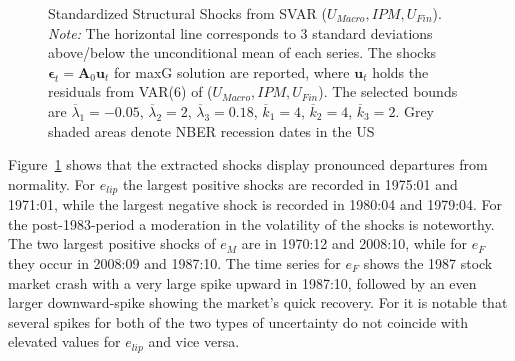 \documentclass[a4paper,11pt,listof=nochaptergap,oneside,pointednumbers,bibtotoc,bigheadings,liststotoc,hidelinks]{scrbook}
\theoremstyle{mysatz}
\theoremstyle{mydefinition}
\theoremstyle{mytheorem}
\theoremstyle{mybemerkung}
\newcommand{\vect}[1]{\boldsymbol{\mathbf{#1}}}
\begin{document}
\begin{figure}[!h]
   \centering
   \setlength\fboxsep{0pt}
   \setlength\fboxrule{0pt}
      \caption[Standardized Structural Shocks from SVAR ($U_{Macro}, IPM, U_{Fin}$).]{Standardized Structural Shocks from SVAR ($U_{Macro}, IPM, U_{Fin}$).\\
      \textit{Note:}  The horizontal line corresponds to 3 standard deviations above/below the unconditional mean of each series. The shocks $\vect{\epsilon}_t = \vect{A}_0\vect{u}_t$ for maxG solution are reported, where $\vect{u}_t$ holds the residuals from VAR(6) of ($U_{Macro}, IPM, U_{Fin}$). The selected bounds are $\overline{\lambda}_1 = -0.05$, $\overline{\lambda}_2 = 2$, $\overline{\lambda}_3 = 0.18$, $\overline{k}_1 = 4$, $\overline{k}_2 = 4$, $\overline{k}_3 = 2$. Grey shaded areas denote NBER recession dates in the US}   \label{fig:ludvigsonetal_timeseries_e_shocks}
\end{figure}

Figure~\ref{fig:ludvigsonetal_timeseries_e_shocks} shows that the extracted shocks display pronounced departures from normality. For $e_{lip}$ the largest positive shocks are recorded in 1975:01 and 1971:01, while the largest negative shock is recorded in 1980:04 and 1979:04. For the post-1983-period a moderation in the volatility of the shocks is noteworthy. The two largest positive shocks of $e_{M}$ are in 1970:12 and 2008:10, while for $e_{F}$ they occur in 2008:09 and 1987:10. The time series for $e_{F}$ shows the 1987 stock market crash with a very large spike upward in 1987:10, followed by an even larger downward-spike showing the market's quick recovery. For \citet{ludvigsonetal:18} it is notable that several spikes for both of the two types of uncertainty do not coincide with elevated values for $e_{lip}$ and vice versa.
\end{document}

